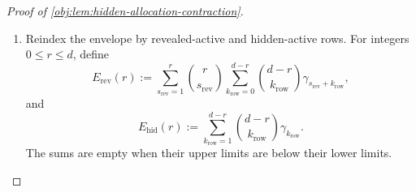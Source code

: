 \begin{proof}[Proof of \cref{obj:lem:hidden-allocation-contraction}]
\begin{enumerate}
Summing over \(k=0,\ldots,M\) covers each admissible degree vector exactly once. The remaining restrictions are rowwise, so the sum factors:
\[
\begin{aligned}
&\sum_{k=0}^M
\frac{\|\mathcal C_{J,k,\mathcal E}\|_{\mathrm{resp}}^2}{\binom Mk}
\\
&\quad\le
\rho_{\nu_{\mathrm{rev}},\nu_{\mathrm{hid}}}^{\nu_{\mathrm{hid}}}
\prod_{\ell\in\mathcal B_J}
\left(
\sum_{k_\ell=0}^{u_\ell}
\binom{u_\ell}{k_\ell}\gamma_{r_{J,\ell}+k_\ell}
\right)
\prod_{\ell\in\mathcal E}
\left(
\sum_{k_\ell=1}^{u_\ell}
\binom{u_\ell}{k_\ell}\gamma_{k_\ell}
\right).
\end{aligned}
\]
Define the active-support envelope by
\[
\begin{aligned}
\mathcal A_H
:=
\sum_{J\subseteq\bigcup_\ell R_\ell}
\sum_{\mathcal E\subseteq\{1,\ldots,B\}\setminus\mathcal B_J}
&\rho_{|\mathcal B_J|,|\mathcal E|}^{|\mathcal E|}
\prod_{\ell\in\mathcal B_J}
\left(
\sum_{k_\ell=0}^{u_\ell}
\binom{u_\ell}{k_\ell}\gamma_{r_{J,\ell}+k_\ell}
\right)
\\[-2pt]
&{}\times
\prod_{\ell\in\mathcal E}
\left(
\sum_{k_\ell=1}^{u_\ell}
\binom{u_\ell}{k_\ell}\gamma_{k_\ell}
\right).
\end{aligned}
\]
Restoring the coefficient \((J,k)=(\varnothing,0)\) adds exactly one to the labeled energy. The support decomposition and the last bound therefore give
\[
\chi_H^2+1\le\mathcal A_H,
\qquad
\chi_H^2\le\mathcal A_H-1
\quad\text{when }M\ge Bd/4.
\]
If \(M<Bd/4\), multiplying either quantity by the remaining-capacity indicator gives zero. This includes \(M=0\).

\item Reindex the envelope by revealed-active and hidden-active rows. For integers \(0\le r\le d\), define
\[
E_{\mathrm{rev}}(r)
:=
\sum_{s_{\mathrm{rev}}=1}^{r}
\binom r{s_{\mathrm{rev}}}
\sum_{k_{\mathrm{row}}=0}^{d-r}
\binom{d-r}{k_{\mathrm{row}}}
\gamma_{s_{\mathrm{rev}}+k_{\mathrm{row}}},
\]
and
\[
E_{\mathrm{hid}}(r)
:=
\sum_{k_{\mathrm{row}}=1}^{d-r}
\binom{d-r}{k_{\mathrm{row}}}\gamma_{k_{\mathrm{row}}}.
\]
The sums are empty when their upper limits are below their lower limits.


\end{enumerate}
\end{proof}

